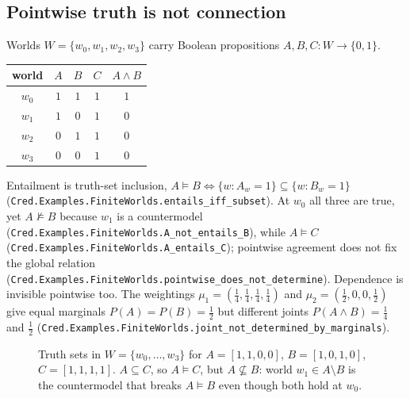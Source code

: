 \documentclass[11pt,a4paper]{article}
\newcommand{\Lean}[1]{\texttt{#1}}
\begin{document}
\subsection{Pointwise truth is not connection}
Worlds $W=\{w_0,w_1,w_2,w_3\}$ carry Boolean propositions
$A,B,C:W\to\{0,1\}$.
\begin{center}
\begin{tabular}{@{}ccccc@{}}
\toprule
world & $A$ & $B$ & $C$ & $A\wedge B$\\
\midrule
$w_0$ & $1$ & $1$ & $1$ & $1$\\
$w_1$ & $1$ & $0$ & $1$ & $0$\\
$w_2$ & $0$ & $1$ & $1$ & $0$\\
$w_3$ & $0$ & $0$ & $1$ & $0$\\
\bottomrule
\end{tabular}
\end{center}
Entailment is truth-set inclusion,
$A\models B\iff\{w:A_w=1\}\subseteq\{w:B_w=1\}$
(\Lean{Cred.Examples.FiniteWorlds.entails\_iff\_subset}).
At $w_0$ all three are true, yet $A\not\models B$ because $w_1$ is a
countermodel (\Lean{Cred.Examples.FiniteWorlds.A\_not\_entails\_B}),
while $A\models C$
(\Lean{Cred.Examples.FiniteWorlds.A\_entails\_C}); pointwise agreement
does not fix the global relation
(\Lean{Cred.Examples.FiniteWorlds.pointwise\_does\_not\_determine}).
Dependence is invisible pointwise too.  The weightings
$\mu_1=(\tfrac14,\tfrac14,\tfrac14,\tfrac14)$ and
$\mu_2=(\tfrac12,0,0,\tfrac12)$ give equal marginals
$P(A)=P(B)=\tfrac12$ but different joints
$P(A\wedge B)=\tfrac14$ and $\tfrac12$
(\Lean{Cred.Examples.FiniteWorlds.joint\_not\_determined\_by\_marginals}).

\begin{figure}[h]
\centering
{}
\caption{Truth sets in $W=\{w_0,\dots,w_3\}$ for $A=[1,1,0,0]$,
$B=[1,0,1,0]$, $C=[1,1,1,1]$.  $A\subseteq C$, so $A\models C$, but
$A\not\subseteq B$: world $w_1\in A\setminus B$ is the countermodel that
breaks $A\models B$ even though both hold at $w_0$.}
\label{fig:finite-worlds}
\end{figure}
\end{document}
